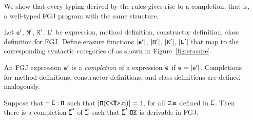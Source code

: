 We show that every typing derived by the \TFGJ rules gives rise to a
completion, that is, a well-typed FGJ program with the same structure.
\begin{definition}[Erasure]\label{def:erasure}
  Let ${\tt e}'$, ${\tt M}'$, ${\tt K}'$, ${\tt L}'$ be expression, method definition, constructor definition, class definition for FGJ. Define erasure functions 
  $|{\tt e}'|$, $|{\tt M}'|$, $|{\tt K}'|$,
  $|{\tt L}'|$ that map to the corresponding syntactic categories
  of \TFGJ as shown in Figure~\ref{fig:erasure}.
  \end{definition}
\begin{definition}[Completion]\label{def:completion}
  An FGJ expression ${\tt e}'$ is a \emph{completion} of a \TFGJ expression ${\tt e}$ if ${\tt e} = |{\tt e}'|$. Completions for method definitions, constructor definitions, and class definitions
  are defined analogously.
\end{definition}
\begin{theorem}
  Suppose that $\mathtt{\vdash \overline{\tt L} : \Pi}$ such that $|\mathtt{\Pi (\mathtt{C \texttt{<} \overline{\tt X} \texttt{>} }.m)}| = 1$, for all ${\tt C.m}$ defined in $\overline{\tt L}$. Then there is a completion $\overline{\tt L}'$ of $\overline{\tt L}$ such that
  $\ol{L}'\ \mathtt{OK}$ is derivable in FGJ. 
\end{theorem}
